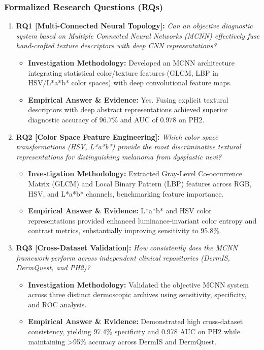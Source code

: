 \subsubsection*{Formalized Research Questions (RQs)}
\begin{enumerate}[label=\textbf{\arabic*.}, leftmargin=*]
  \item \textbf{RQ1 [Multi-Connected Neural Topology]:} \textit{Can an objective diagnostic system based on Multiple Connected Neural Networks (MCNN) effectively fuse hand-crafted texture descriptors with deep CNN representations?}
  \begin{itemize}[leftmargin=1.5em]
    \item \textbf{Investigation Methodology:} Developed an MCNN architecture integrating statistical color/texture features (GLCM, LBP in HSV/L*a*b* color spaces) with deep convolutional feature maps.
    \item \textbf{Empirical Answer \& Evidence:} Yes. Fusing explicit textural descriptors with deep abstract representations achieved superior diagnostic accuracy of 96.7\% and AUC of 0.978 on PH2.
  \end{itemize}
  \item \textbf{RQ2 [Color Space Feature Engineering]:} \textit{Which color space transformations (HSV, L*a*b*) provide the most discriminative textural representations for distinguishing melanoma from dysplastic nevi?}
  \begin{itemize}[leftmargin=1.5em]
    \item \textbf{Investigation Methodology:} Extracted Gray-Level Co-occurrence Matrix (GLCM) and Local Binary Pattern (LBP) features across RGB, HSV, and L*a*b* channels, benchmarking feature importance.
    \item \textbf{Empirical Answer \& Evidence:} L*a*b* and HSV color representations provided enhanced luminance-invariant color entropy and contrast metrics, substantially improving sensitivity to 95.8\%.
  \end{itemize}
  \item \textbf{RQ3 [Cross-Dataset Validation]:} \textit{How consistently does the MCNN framework perform across independent clinical repositories (DermIS, DermQuest, and PH2)?}
  \begin{itemize}[leftmargin=1.5em]
    \item \textbf{Investigation Methodology:} Validated the objective MCNN system across three distinct dermoscopic archives using sensitivity, specificity, and ROC analysis.
    \item \textbf{Empirical Answer \& Evidence:} Demonstrated high cross-dataset consistency, yielding 97.4\% specificity and 0.978 AUC on PH2 while maintaining >95\% accuracy across DermIS and DermQuest.

\end{itemize}
\end{enumerate}
